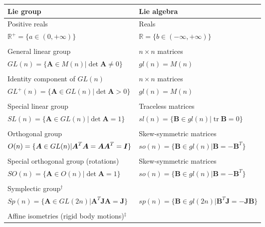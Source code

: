 \documentclass[12pt]{article}
\newcommand{\mbs}[1]{\boldsymbol{#1}}
\newcommand{\mbb}[1]{\mathbb{#1}}
\def\bA{{\mbs{A}}} \def\bB{{\mbs{B}}} \def\bC{{\mbs{C}}}
\def\bJ{{\mbs{J}}} \def\bK{{\mbs{K}}} \def\bL{{\mbs{L}}}
\DeclareMathOperator{\tr}{tr}
\begin{document}
\begin{table}[htbp]
  \begin{center}
    \begin{tabular}{ l l }
      \toprule
      Lie group
      &
      Lie algebra
      \\
      \hline
      Positive reals
      &
      Reals
      \\
      $\mbb{R}^+ = \{ a \in (0,+\infty) \}$
      &
      $\mbb{R} = \{ b \in (-\infty, +\infty) \}$
      \\
      \\
      General linear group
      &
      $n\times n$ matrices
      \\
      $GL(n)=\{\bA\in M(n) | \det \bA \neq 0\}$
      &
      $gl(n)=M(n)$
      \\
      \\
      Identity component of $GL(n)$
      &
      $n\times n$ matrices
      \\
      $GL^+(n)=\{\bA\in GL(n) | \det \bA > 0\}$
      &
      $gl(n)=M(n)$
      \\
      \\
      Special linear group
      &
      Traceless matrices
      \\
      $SL(n)=\{\bA\in GL(n) | \det \bA = 1\}$
      &
      $sl(n)=\{\bB\in gl(n) | \tr \bB = 0\}$
      \\
      \\
      Orthogonal group
      &
      Skew-symmetric matrices
      \\
      $O(n)=\{\bA\in GL(n) | \bA^T\bA = \bA\bA^T = \bI\}$
      &
      $so(n)=\{\bB\in gl(n) | \bB = -\bB^T\}$
      \\
      \\
      Special orthogonal group (rotations)
      &
      Skew-symmetric matrices
      \\
      $SO(n)=\{\bA\in O(n) | \det \bA=1\}$
      &
      $so(n)=\{\bB\in gl(n) | \bB = -\bB^T\}$
      \\
      \\
      Symplectic group$^\dagger$
      &
      
      \\
      $Sp(n)=\{\bA\in GL(2n) | \bA^T \bJ\bA = \bJ\}$
      &
      $sp(n)=\{\bB\in gl(2n) | \bB^T \bJ = -\bJ \bB\}$
      \\
      \\
      Affine isometries (rigid body motions)$^\ddagger$
      &
      

\end{tabular}
\end{center}
\end{table}
\end{document}

